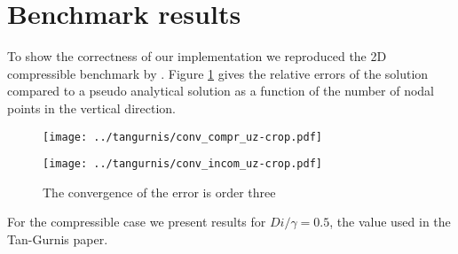 \section{Benchmark results}
To show the correctness of our implementation we reproduced the 2D compressible benchmark by \cite{Tan}.
Figure \ref{fig:Convergence} gives the relative errors of the solution compared to a pseudo analytical solution as a function  of the number of nodal points in the vertical direction.

\begin{figure}
 \centering
 \texttt{[image: ../tangurnis/conv\_compr\_uz-crop.pdf]}

 \texttt{[image: ../tangurnis/conv\_incom\_uz-crop.pdf]}
 \caption{The convergence of the error is order three}
 \label{fig:Convergence}
\end{figure}

For the compressible case we present results for $Di/\gamma = 0.5$, the value used in the Tan-Gurnis paper.
